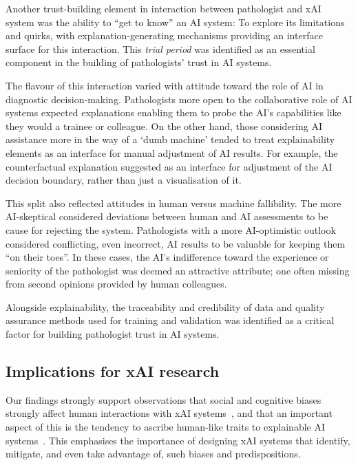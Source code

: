 \documentclass[final,5p,times,twocolumn,hyphens]{elsarticle}
\begin{document}
Another trust-building element in interaction between pathologist and xAI system was the ability to ``get to know'' an AI system: To explore its limitations and quirks, with explanation-generating mechanisms providing an interface surface for this interaction. This \textit{trial period} was identified as an essential component in the building of pathologists' trust in AI systems. 

The flavour of this interaction varied with attitude toward the role of AI in diagnostic decision-making. Pathologists more open to the collaborative role of AI systems expected explanations enabling them to probe the AI's capabilities like they would a trainee or colleague. On the other hand, those considering AI assistance more in the way of a `dumb machine' tended to treat explainability elements as an interface for manual adjustment of AI results. For example, the counterfactual explanation suggested as an interface for adjustment of the AI decision boundary, rather than just a visualisation of it.

This split also reflected attitudes in human versus machine fallibility. The more AI-skeptical considered deviations between human and AI assessments to be cause for rejecting the system. Pathologists with a more AI-optimistic outlook considered conflicting, even incorrect, AI results to be valuable for keeping them ``on their toes''. In these cases, the AI's indifference toward the experience or seniority of the pathologist was deemed an attractive attribute; one often missing from second opinions provided by human colleagues.

Alongside explainability, the traceability and credibility of data and quality assurance methods used for training and validation was identified as a critical factor for building pathologist trust in AI systems.

\subsection{Implications for xAI research}

Our findings strongly support observations that social and cognitive biases strongly affect human interactions with xAI systems~\cite{miller2019explanation, jussupow2021augmenting}, and that an important aspect of this is the tendency to ascribe human-like traits to explainable AI systems~\citet{de2017people, miller2019explanation}. This emphasises the importance of designing xAI systems that identify, mitigate, and even take advantage of, such biases and predispositions.
\end{document}
